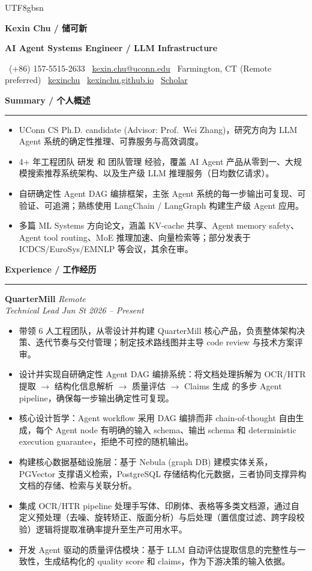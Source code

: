 \documentclass[]{resume}
\renewenvironment{rSection}[1]{%
  \vspace{0.5em}%
  \textbf{#1}%
  \vspace{0.16em}%
  \hrule
  \vspace{0.25em}%
  \begin{list}{}{%
    \setlength{\leftmargin}{0.85em}%
    \setlength{\rightmargin}{0em}%
    \setlength{\itemsep}{0pt}%
    \setlength{\topsep}{0pt}%
    \setlength{\parsep}{0pt}%
    \setlength{\partopsep}{0pt}%
  }%
  \item[]%
}{%
  \end{list}%
  \vspace{-0.28em}%
}
\newcommand{\MakeHeader}[8]{%
\noindent
{\centering \bfseries \Large #1 \par}
\vspace{2pt}

\noindent
\colorbox{HeaderOrange}{%
  \parbox{\textwidth}{%
    \vspace{2pt}
    \centering
    {\color{white}\bfseries\small #2}
    \vspace{2pt}
  }%
}\par

\noindent
\colorbox{HeaderLight}{%
  \parbox{\textwidth}{%
    \vspace{2pt}
    \scriptsize
    \faPhone\ #3 \hfill
    \faEnvelope\ \href{mailto:#4}{#4} \hfill
    \faMapMarker*\ #5 \hfill
    \faLinkedin\ \href{#6}{kexinchu} \hfill
    \faGlobe\ \href{#7}{kexinchu.github.io} \hfill
    \faGraduationCap\ \href{#8}{Scholar}
    \vspace{2pt}
  }%
}\par
}
\begin{document}
\begin{CJK}{UTF8}{gbsn}

\MakeHeader
{Kexin Chu / 储可新}
{AI Agent Systems Engineer / LLM Infrastructure}
{(+86) 157-5515-2633}
{kexin.chu@uconn.edu}
{Farmington, CT (Remote preferred)}
{https://www.linkedin.com/in/kexin-chu-69a481192}
{https://kexinchu.github.io/}
{https://scholar.google.com/citations?user=ZIdS3d0AAAAJ}

\fontsize{10.3pt}{12.1pt}\selectfont

\begin{rSection}{Summary / 个人概述}
\begin{itemize}
    \item UConn CS Ph.D. candidate (Advisor: Prof.\ Wei Zhang)，研究方向为 LLM Agent 系统的确定性推理、可靠服务与高效调度。
    \item 4+ 年工程团队 研发 和 团队管理 经验，覆盖 AI Agent 产品从零到一、大规模搜索推荐系统架构、以及生产级 LLM 推理服务（日均数亿请求）。
    \item 自研确定性 Agent DAG 编排框架，主张 Agent 系统的每一步输出可复现、可验证、可追溯；熟练使用 LangChain / LangGraph 构建生产级 Agent 应用。
    \item 多篇 ML Systems 方向论文，涵盖 KV-cache 共享、Agent memory safety、Agent tool routing、MoE 推理加速、向量检索等；部分发表于 ICDCS/EuroSys/EMNLP 等会议，其余在审。
\end{itemize}
\end{rSection}

\begin{rSection}{Experience / 工作经历}
\textbf{QuarterMill} \hfill \textit{Remote}\\
\textit{Technical Lead} \hfill \textit{Jun St 2026 -- Present}
\begin{itemize}
    \item 带领 6 人工程团队，从零设计并构建 QuarterMill 核心产品，负责整体架构决策、迭代节奏与交付管理；制定技术路线图并主导 code review 与技术方案评审。
    \item 设计并实现自研确定性 Agent DAG 编排系统：将文档处理拆解为 OCR/HTR 提取 $\rightarrow$ 结构化信息解析 $\rightarrow$ 质量评估 $\rightarrow$ Claims 生成 的多步 Agent pipeline，确保每一步输出确定性可复现。
    \item 核心设计哲学：Agent workflow 采用 DAG 编排而非 chain-of-thought 自由生成，每个 Agent node 有明确的输入 schema、输出 schema 和 deterministic execution guarantee，拒绝不可控的随机输出。
    \item 构建核心数据基础设施层：基于 Nebula (graph DB) 建模实体关系，PGVector 支撑语义检索，PostgreSQL 存储结构化元数据，三者协同支撑异构文档的存储、检索与关联分析。
    \item 集成 OCR/HTR pipeline 处理手写体、印刷体、表格等多类文档源，通过自定义预处理（去噪、旋转矫正、版面分析）与后处理（置信度过滤、跨字段校验）逻辑将提取准确率提升至生产可用水平。
    \item 开发 Agent 驱动的质量评估模块：基于 LLM 自动评估提取信息的完整性与一致性，生成结构化的 quality score 和 claims，作为下游决策的输入依据。
\end{itemize}


\end{rSection}
\end{CJK}
\end{document}
